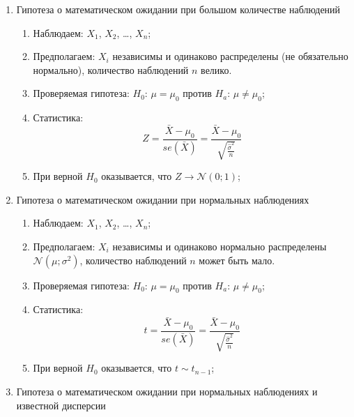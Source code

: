 \documentclass[12pt, a4paper]{article}
\def \cN{\mathcal{N}}
\begin{document}
\begin{enumerate}

  \item Гипотеза о математическом ожидании при большом количестве наблюдений
    \begin{enumerate}

      \item Наблюдаем: $X_1$, $X_2$, \ldots, $X_n$;

      \item Предполагаем: $X_i$ независимы и одинаково распределены (не обязательно нормально), количество наблюдений $n$ велико.

      \item Проверяемая гипотеза: $H_0$: $\mu = \mu_0$ против $H_a$: $\mu \neq \mu_0$;

      \item Статистика:
	\[
	  Z = \frac{\bar X - \mu_0}{se(\bar X)} = \frac{\bar X - \mu_0}{\sqrt{\frac{\hat \sigma^2}{n}}}
	\]

      \item При верной $H_0$ оказывается, что $Z \to \cN(0;1)$;
    \end{enumerate}

  \item Гипотеза о математическом ожидании при нормальных наблюдениях
    \begin{enumerate}

      \item Наблюдаем: $X_1$, $X_2$, \ldots, $X_n$;

      \item Предполагаем: $X_i$ независимы и одинаково нормально распределены $\cN(\mu; \sigma^2)$, количество наблюдений $n$ может быть мало.

      \item Проверяемая гипотеза: $H_0$: $\mu = \mu_0$ против $H_a$: $\mu \neq \mu_0$;

      \item Статистика:
	\[
	  t = \frac{\bar X - \mu_0}{se(\bar X)} = \frac{\bar X - \mu_0}{\sqrt{\frac{\hat \sigma^2}{n}}}
	\]

      \item При верной $H_0$ оказывается, что $t \sim t_{n-1}$;
    \end{enumerate}


  \item Гипотеза о математическом ожидании при нормальных наблюдениях и известной дисперсии
    \begin{enumerate}


\end{enumerate}
\end{enumerate}
\end{document}
